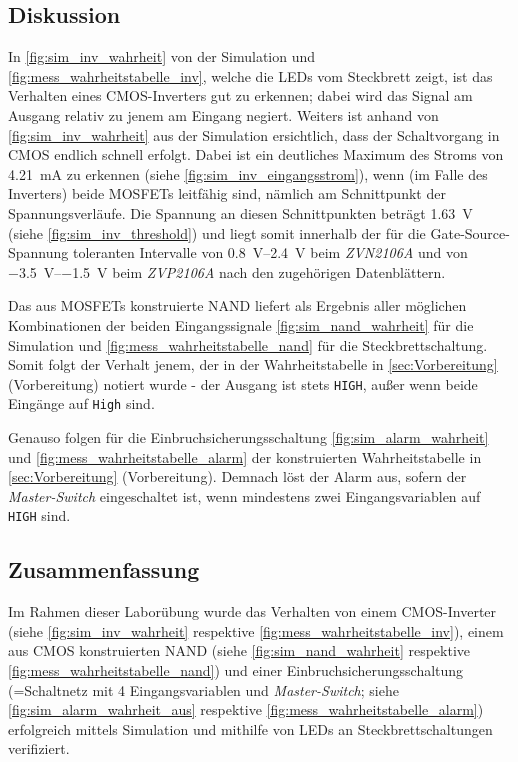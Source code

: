 \documentclass[12pt,english,ngerman]{scrartcl}
\begin{document}
\subsection{Diskussion}
In \autoref{fig:sim_inv_wahrheit} von der Simulation und
\autoref{fig:mess_wahrheitstabelle_inv}, welche die LEDs vom Steckbrett zeigt,
ist das Verhalten eines CMOS-Inverters gut zu erkennen; dabei wird das Signal
am Ausgang relativ zu jenem am Eingang negiert.
Weiters ist anhand von \autoref{fig:sim_inv_wahrheit} aus der Simulation ersichtlich, dass
der Schaltvorgang in CMOS endlich schnell erfolgt. Dabei ist ein deutliches
Maximum des Stroms von \SI{4,21}{\milli \ampere} zu erkennen (siehe \autoref{fig:sim_inv_eingangsstrom}), 
wenn (im Falle des Inverters) beide MOSFETs
leitfähig sind, nämlich am Schnittpunkt der Spannungsverläufe.
Die Spannung an diesen Schnittpunkten beträgt \SI{1,63}{\volt} 
(siehe \autoref{fig:sim_inv_threshold}) und liegt
somit innerhalb der für die Gate-Source-Spannung toleranten Intervalle
von \SIrange{0.8}{2.4}{\volt} beim \textit{ZVN2106A} und von
\SIrange{-3.5}{-1.5}{\volt} beim \textit{ZVP2106A} nach den zugehörigen Datenblättern.

Das aus MOSFETs konstruierte NAND liefert als Ergebnis aller möglichen
Kombinationen der beiden Eingangssignale \autoref{fig:sim_nand_wahrheit} für die Simulation
und \autoref{fig:mess_wahrheitstabelle_nand} für die Steckbrettschaltung.
Somit folgt der Verhalt jenem, der in der Wahrheitstabelle in \autoref{sec:Vorbereitung}
(Vorbereitung) notiert wurde - der Ausgang ist stets \texttt{HIGH}, außer wenn
beide Eingänge auf \texttt{High} sind.

Genauso folgen für die Einbruchsicherungsschaltung \autoref{fig:sim_alarm_wahrheit} 
und \autoref{fig:mess_wahrheitstabelle_alarm}
der konstruierten Wahrheitstabelle in \autoref{sec:Vorbereitung} (Vorbereitung).
Demnach löst der Alarm aus, sofern der \textit{Master-Switch} eingeschaltet ist, 
wenn mindestens
zwei Eingangsvariablen auf \texttt{HIGH} sind.


\subsection{Zusammenfassung}
Im Rahmen dieser Laborübung wurde das Verhalten von einem CMOS-Inverter (siehe \autoref{fig:sim_inv_wahrheit}
respektive \autoref{fig:mess_wahrheitstabelle_inv}), 
einem aus CMOS konstruierten NAND (siehe \autoref{fig:sim_nand_wahrheit}
respektive \autoref{fig:mess_wahrheitstabelle_nand}) und einer Einbruchsicherungsschaltung 
(=Schaltnetz mit 4 Eingangsvariablen
und \textit{Master-Switch}; siehe \autoref{fig:sim_alarm_wahrheit_aus}
respektive \autoref{fig:mess_wahrheitstabelle_alarm}) erfolgreich mittels 
Simulation und mithilfe von LEDs an Steckbrettschaltungen
verifiziert.
\newpage

\printbibliography

\listoffigures

\listoftables
\end{document}
